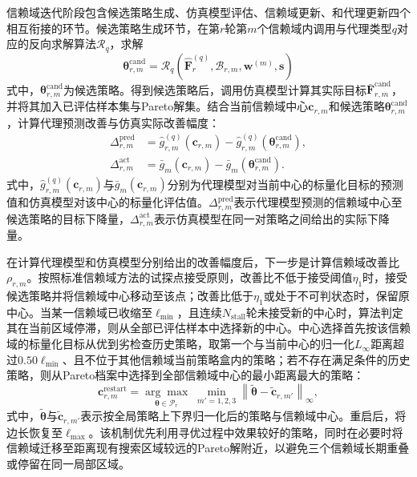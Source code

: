 信赖域迭代阶段包含候选策略生成、仿真模型评估、信赖域更新、和代理更新四个相互衔接的环节。候选策略生成环节，在第$r$轮第$m$个信赖域内调用与代理类型$q$对应的反向求解算法$\mathcal R_q$，求解
\begin{equation}
\bm{\theta}_{r,m}^{\mathrm{cand}}
=
\mathcal R_q
\left(
\widehat{\bm F}_{r}^{(q)},
\mathcal B_{r,m},
\bm w^{(m)},
\bm s
\right)
\label{eq.opt.trcandidate}
\end{equation}
式中，$\bm{\theta}_{r,m}^{\mathrm{cand}}$为候选策略。得到候选策略后，调用仿真模型计算其实际目标$\bar{\bm F}_{r,m}^{\mathrm{cand}}$，并将其加入已评估样本集与Pareto解集。结合当前信赖域中心$\bm c_{r,m}$和候选策略$\bm{\theta}_{r,m}^{\mathrm{cand}}$，计算代理预测改善与仿真实际改善幅度：
\begin{equation}
\begin{aligned}
\Delta_{r,m}^{\mathrm{pred}}
&=
\widehat g_{r,m}^{(q)}\left(\bm c_{r,m}\right)
-\widehat g_{r,m}^{(q)}
\left(\bm{\theta}_{r,m}^{\mathrm{cand}}\right),\\
\Delta_{r,m}^{\mathrm{act}}
&=
\bar g_m\left(\bm c_{r,m}\right)
-\bar g_m\left(\bm{\theta}_{r,m}^{\mathrm{cand}}\right).
\end{aligned}
\label{eq.opt.improvement}
\end{equation}
式中，$\widehat g_{r,m}^{(q)}(\bm c_{r,m})$与$\bar g_m(\bm c_{r,m})$分别为代理模型对当前中心的标量化目标的预测值和仿真模型对该中心的标量化评估值。$\Delta_{r,m}^{\mathrm{pred}}$表示代理模型预测的信赖域中心至候选策略的目标下降量，$\Delta_{r,m}^{\mathrm{act}}$表示仿真模型在同一对策略之间给出的实际下降量。

在计算代理模型和仿真模型分别给出的改善幅度后，下一步是计算信赖域改善比$\rho_{r,m}$。按照标准信赖域方法的试探点接受原则，改善比不低于接受阈值$\eta_1$时，接受候选策略并将信赖域中心移动至该点；改善比低于$\eta_1$或处于不可判状态时，保留原中心。当某一信赖域已收缩至$\ell_{\min}$，且连续$N_{\mathrm{stall}}$轮未接受新的中心时，算法判定其在当前区域停滞，则从全部已评估样本中选择新的中心。中心选择首先按该信赖域的标量化目标从优到劣检查历史策略，取第一个与当前中心的归一化$L_{\infty}$距离超过$0.50\ell_{\min}$、且不位于其他信赖域当前策略盒内的策略；若不存在满足条件的历史策略，则从Pareto档案中选择到全部信赖域中心的最小距离最大的策略：
\begin{equation}
\bm c_{r,m}^{\mathrm{restart}}
=
\underset{\bm{\theta}\in\mathcal P_r}{\arg\max}\;
\min_{m'=1,2,3}
\left\|
\widetilde{\bm{\theta}}
-\widetilde{\bm c}_{r,m'}
\right\|_{\infty},
\label{eq.opt.trrestart}
\end{equation}
式中，$\widetilde{\bm{\theta}}$与$\widetilde{\bm c}_{r,m'}$表示按全局策略上下界归一化后的策略与信赖域中心。重启后，将边长恢复至$\ell_{\max}$。该机制优先利用寻优过程中效果较好的策略，同时在必要时将信赖域迁移至距离现有搜索区域较远的Pareto解附近，以避免三个信赖域长期重叠或停留在同一局部区域。

